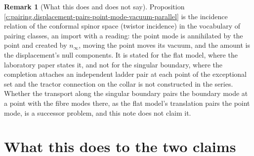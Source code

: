 \documentclass[11pt]{article}
\theoremstyle{definition}
\newtheorem{remark}[theorem]{Remark}
\theoremstyle{plain}
\providecommand{\ninf}{}\renewcommand{\ninf}{n_{\infty}}
\begin{document}
\begin{remark}[What this does and does not say]\label{c:note.pairing.what-does-does-not-say}
Proposition \ref{c:pairing.displacement-pairs-point-mode-vacuum-parallel} is the incidence relation of the conformal spinor space (twistor incidence) in the vocabulary of pairing classes, an import with a reading: the point mode is annihilated by the point and created by $\ninf$, moving the point moves its vacuum, and the amount is the displacement's null components. It is stated for the flat model, where the laboratory paper states it, and not for the singular boundary, where the completion attaches an independent ladder pair at each point of the exceptional set and the tractor connection on the collar is not constructed in the series. Whether the transport along the singular boundary pairs the boundary mode at a point with the fibre modes there, as the flat model's translation pairs the point mode, is a successor problem, and this note does not claim it.
\end{remark}

\section{What this does to the two claims}
\end{document}
